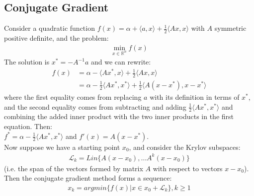 \documentclass[12pt,a4paper]{article}
\begin{document}
	\subsection*{Conjugate Gradient}\label{subsec:CG}
	Consider a quadratic function $f(x) = \alpha + \langle a, x \rangle + \frac{1}{2} \langle Ax, x \rangle$ with $A$ symmetric positive definite, and the problem:
	\begin{align*}
		\min_{x \in \mathbb{R}^n} f(x)
	\end{align*}
	The solution is $x^* = -A^{-1}a$ and we can rewrite:
	\begin{align*}
		f(x) &= \alpha - \langle Ax^*, x \rangle + \frac{1}{2} \langle Ax, x \rangle  \\
		&= \alpha - \frac{1}{2} \langle Ax^*, x^* \rangle + \frac{1}{2} \langle A(x - x^*), x-x^* \rangle 
	\end{align*}
	where the first equality comes from replacing $a$ with its definition in terms of $x^*$, and the second equality comes from subtracting and adding $\frac{1}{2}\langle A x^*, x^* \rangle$ and combining the added inner product with the two inner products in the first equation. Then:\\
	$f^* = \alpha - \frac{1}{2} \langle Ax^*, x^* \rangle$ and $f'(x) = A(x - x^*)$.\\
	Now suppose we have a starting point $x_0$, and consider the Krylov subspaces:
	\begin{align*}
		\mathcal{L}_k = Lin \{A(x - x_0), \ldots A^k (x - x_0) \}
	\end{align*}
	(i.e. the span of the vectors formed by matrix $A$ with respect to vectors $x - x_0$). Then the conjugate gradient method forms a sequence:
	\begin{align*}
		x_k = argmin \{f(x) | x \in x_0 + \mathcal{L}_k\}, k \geq 1
	\end{align*}
	
\end{document}

